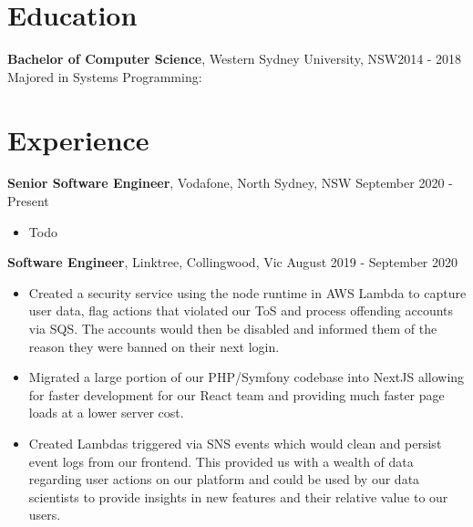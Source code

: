 \documentclass[overlapped]{res}
\begin{document}

\address{{\bf Present Address} \\ 309 Eighth Avenue \\ Llandilo, NSW 2747}
\address{{\bf Contact Details} \\ ben.hili1994@gmail.com \\ +61414329597}


\begin{resume}

\section{Education}
	{\bf Bachelor of Computer Science}, Western Sydney University, NSW\hfill 2014 - 2018\\
	Majored in Systems Programming:

\section{Experience}
{\bf Senior Software Engineer},
	Vodafone, North Sydney, NSW \hfill September 2020 - Present
\begin{itemize} \itemsep 2pt  %
	\item Todo
\end{itemize}

{\bf Software Engineer},
	Linktree, Collingwood, Vic \hfill August 2019 - September 2020
\begin{itemize} \itemsep 2pt  %

\item Created a security service using the node runtime in AWS Lambda to capture user data, flag actions that violated our ToS and process offending accounts via SQS. The accounts would then be disabled and informed them of the reason they were banned on their next login.

\item Migrated a large portion of our PHP/Symfony codebase into NextJS allowing for faster development for our React team and providing much faster page loads at a lower server cost.

\item Created Lambdas triggered via SNS events which would clean and persist event logs from our frontend. This provided us with a wealth of data regarding user actions on our platform and could be used by our data scientists to provide insights in new features and their relative value to our users.


\end{itemize}
\end{resume}
\end{document}
